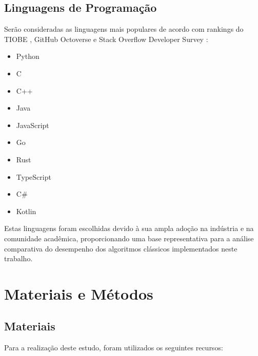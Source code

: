 \documentclass[12pt,oneside,a4paper]{report}
\begin{document}
\section{Linguagens de Programação}

Serão consideradas as linguagens mais populares de acordo com rankings do TIOBE \cite{tiobe}, GitHub Octoverse \cite{octoverse} e Stack Overflow Developer Survey \cite{stackoverflow}:

\begin{itemize}
    \item Python
    \item C
    \item C++
    \item Java
    \item JavaScript
    \item Go
    \item Rust
    \item TypeScript
    \item C\#
    \item Kotlin
\end{itemize}

Estas linguagens foram escolhidas devido à sua ampla adoção na indústria e na comunidade acadêmica, proporcionando uma base representativa para a análise comparativa do desempenho dos algoritmos clássicos implementados neste trabalho.


\chapter{Materiais e Métodos}

\section{Materiais}

Para a realização deste estudo, foram utilizados os seguintes recursos:
\end{document}
